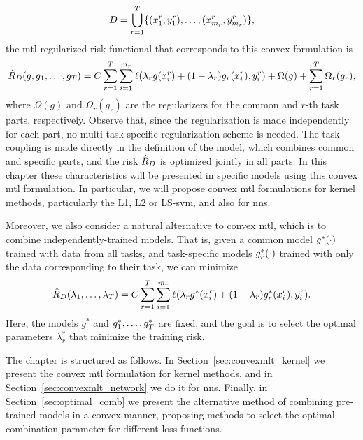 $$D = \bigcup_{r=1}^T \{(x_1^r, y_1^r), \ldots, (x_{m_r}^r, y_{m_r}^r)\},$$
the \acrshort{mtl} regularized risk functional that corresponds to this convex formulation is 
\begin{equation}
    \nonumber
    \hat{R}_{D} ({g, g_1, \ldots, g_T}) = C\sum_{r=1}^{T} \sum_{i=1}^{m_r} \ell(\lambda_r g(x_i^r) + (1 - \lambda_r) g_r(x_i^r), y_i^r) + \Omega(g) + \sum_{r=1}^T \Omega_r(g_r) ,
\end{equation}
where $\Omega(g)$ and $\Omega_r(g_r)$ are the regularizers for the common and $r$-th task parts, respectively. Observe that, since the regularization is made independently for each part, no multi-task specific regularization scheme is needed. The task coupling is made directly in the definition of the model, which combines common and specific parts, and the risk $\hat{R}_{D}$ is optimized jointly in all parts.
In this chapter these characteristics will be presented in specific models using this convex \acrshort{mtl} formulation. In particular, we will propose convex \acrshort{mtl} formulations for kernel methods, particularly the L1, L2 or LS-\acrfull{svm}, and also for \acrfull{nns}.
%

Moreover, we also consider a natural alternative to convex \acrshort{mtl}, which is to combine independently-trained models. That is, given a common model ${g}^*(\cdot)$ trained with data from all tasks, and task-specific models ${g}^*_r(\cdot)$ trained with only the data corresponding to their task, we can minimize 
\begin{equation}
    \nonumber
    \hat{R}_{D} (\lambda_1, \ldots, \lambda_T) = C\sum_{r=1}^{T} \sum_{i=1}^{m_r} \ell(\lambda_r g^*(x_i^r) + (1 - \lambda_r) g^*_r(x_i^r), y_i^r)  .
\end{equation}
Here, the models $g^*$ and $g^*_1, \ldots, g^*_T$ are fixed, and the goal is to select the optimal parameters $\lambda^*_r$ that minimize the training risk.

%
The chapter is structured as follows. In Section~\ref{sec:convexmlt_kernel} we present the convex \acrshort{mtl} formulation for kernel methods, and in Section~\ref{sec:convexmlt_network} we do it for \acrshort{nns}.
Finally, in Section~\ref{sec:optimal_comb} we present the alternative method of combining pre-trained models in a convex manner, proposing methods to select the optimal combination parameter for different loss functions.
%




